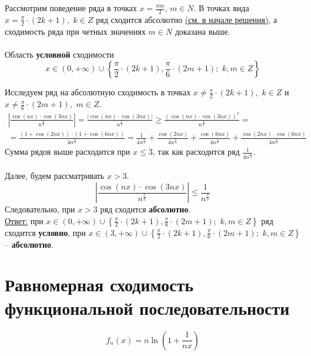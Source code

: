 \documentclass[a5paper, 10pt]{article}
\theoremstyle{definition}
\theoremstyle{plain}
\theoremstyle{remark}
\begin{document}
Рассмотрим поведение ряда в точках $x = \frac{\pi m}{2}, \, m \in N$. В точках вида $x = \frac{\pi}{2} \cdot (2k + 1), \,\, k \in  Z$ ряд сходится абсолютно \hyperlink{pdf}{ (см. в начале решения)}, а сходимость ряда при четных значениях $m \in N$ доказана выше.\\\\
Область \textbf{условной} сходимости  $$x \in (0, + \infty)  \cup \left\{  \frac{\pi}{2} \cdot (2k + 1), \frac{\pi}{6} \cdot (2m + 1); \,\, k ,  m\in Z\right\}$$

Исследуем ряд на абсолютную сходимость в точках  $x \neq \frac{\pi}{2} \cdot (2k + 1), \,\, k \in Z$  и $x \neq \frac{\pi}{6} \cdot (2m + 1), \,\, m \in Z$.
\begin{multline*}
\left| \frac{\cos( nx) \cdot \cos (3nx) }{n^{\frac{x}{3}}}  \right| =  \frac{\left|\cos( nx) \cdot \cos (3nx)\right| }{n^{\frac{x}{3}}}
\geq   \frac{\left(\cos( nx) \cdot \cos (3nx)\right)^2 }{n^{\frac{x}{3}}} = \\
= \frac{\left(1 + \cos(2 nx)\right) \cdot \left(1 +  \cos (6nx)\right)}{4n^{\frac{x}{3}}} =
\frac{1}{4n^{\frac{x}{3}}}+\frac{ \cos(2 nx)}{4n^{\frac{x}{3}}}+\frac{\cos (6nx)}{4n^{\frac{x}{3}}}+\frac{\cos(2 nx) \cdot \cos (6nx)}{4n^{\frac{x}{3}}}
\end{multline*}
Сумма рядов выше расходится при $x \leq 3$, так как расходится ряд $\frac{1}{4n^{\frac{x}{3}}}$.\\\\
 Далее, будем рассматривать $x > 3$.
\begin{equation*}
\left| \frac{\cos( nx) \cdot \cos (3nx) }{n^{\frac{x}{3}}}  \right| \leq  \frac{1}{n^{\frac{x}{3}}}
\end{equation*}
Следовательно, при $x > 3$ ряд сходится \textbf{абсолютно}.\\
 
\underline{Ответ:} при $x \in (0, + \infty)  \cup \left\{  \frac{\pi}{2} \cdot (2k + 1), \frac{\pi}{6} \cdot (2m + 1); \,\, k ,  m\in Z\right\}$  ряд сходится \textbf{условно}, при $x \in (3, + \infty)  \cup \left\{  \frac{\pi}{2} \cdot (2k + 1), \frac{\pi}{6} \cdot (2m + 1); \,\, k ,  m\in Z\right\}$  -- \textbf{абсолютно}.


\newpage
\section{Равномерная сходимость функциональной последовательности}
\begin{equation*}
f_n (x) = n \ln \left( 1+ \frac{1}{nx} \right)
\end{equation*}
\end{document}
